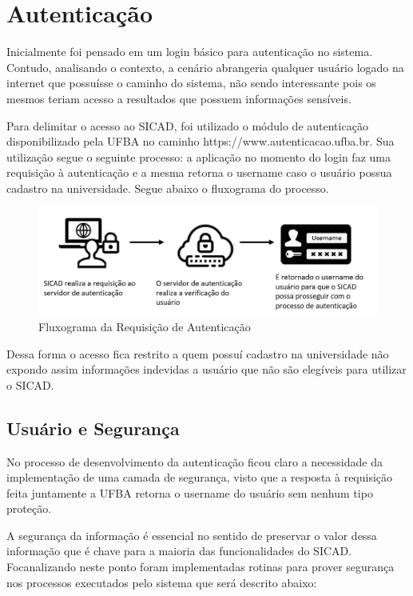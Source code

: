 \documentclass[12pt, a4paper]{report}
\begin{document}
\section{ Autenticação}
\par Inicialmente foi pensado em um login básico para autenticação no sistema. Contudo, analisando o contexto, a cenário abrangeria qualquer usuário logado na internet que possuísse o caminho do sistema, não sendo interessante pois os mesmos teriam acesso a resultados que possuem informações sensíveis.
\par Para delimitar o acesso ao SICAD, foi utilizado o módulo de autenticação disponibilizado pela UFBA no caminho https://www.autenticacao.ufba.br. Sua utilização segue o seguinte processo: a aplicação no momento do login faz uma requisição à autenticação e a mesma retorna o username caso o usuário possua cadastro na universidade. Segue abaixo o fluxograma do processo.
\begin{figure}[!ht]
\centering
\includegraphics[scale=0.50]{processo_autenticacao.jpg}
\caption{Fluxograma da Requisição de Autenticação}
\label{fig:processo_autenticacao}
\end{figure}

\par Dessa forma o acesso fica restrito a quem possuí cadastro na universidade não expondo assim informações indevidas a usuário que não são elegíveis para utilizar o SICAD.

\subsection{Usuário e Segurança}
\par No processo de desenvolvimento  da autenticação ficou claro a necessidade da implementação de uma camada de segurança, visto que a resposta à requisição feita juntamente a UFBA retorna o username do usuário sem nenhum tipo proteção.
\par A segurança da informação é essencial no sentido de preservar o valor dessa informação que é chave para a maioria das funcionalidades do SICAD. Focanalizando neste ponto foram implementadas rotinas para prover segurança nos processos executados pelo sistema que será descrito abaixo:
\end{document}
